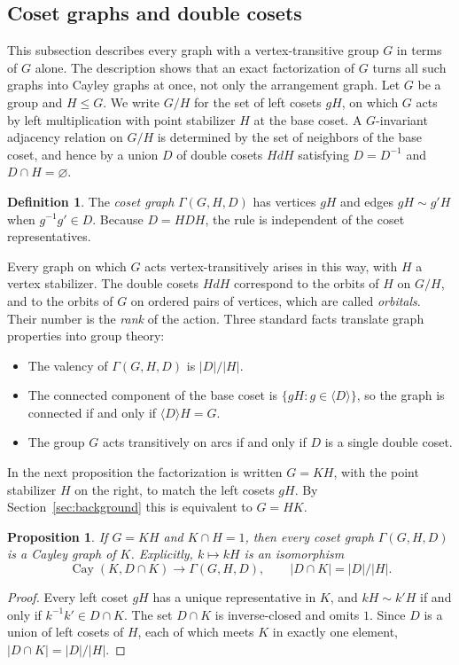 \documentclass[12pt,letterpaper]{article}
\numberwithin{equation}{section}
\newtheorem{proposition}[theorem]{Proposition}
\theoremstyle{definition}
\newtheorem{definition}[theorem]{Definition}
\DeclareMathOperator{\cayy}{Cay}
\begin{document}
\subsection{Coset graphs and double cosets}
This subsection describes every graph with a vertex-transitive group $G$ in terms of $G$ alone. The description shows that an exact factorization of $G$ turns all such graphs into Cayley graphs at once, not only the arrangement graph. Let $G$ be a group and $H\leq G$. We write $G/H$ for the set of left cosets $gH$, on which $G$ acts by left multiplication with point stabilizer $H$ at the base coset. A $G$-invariant adjacency relation on $G/H$ is determined by the set of neighbors of the base coset, and hence by a union $D$ of double cosets $HdH$ satisfying $D=D^{-1}$ and $D\cap H=\varnothing$.
\begin{definition}
The \emph{coset graph} $\Gamma(G,H,D)$ has vertices $gH$ and edges $gH\sim g'H$ when $g^{-1}g'\in D$. Because $D=HDH$, the rule is independent of the coset representatives.
\end{definition}
Every graph on which $G$ acts vertex-transitively arises in this way, with $H$ a vertex stabilizer. The double cosets $HdH$ correspond to the orbits of $H$ on $G/H$, and to the orbits of $G$ on ordered pairs of vertices, which are called \emph{orbitals}. Their number is the \emph{rank} of the action. Three standard facts translate graph properties into group theory:
\begin{itemize}
\item The valency of $\Gamma(G,H,D)$ is $|D|/|H|$.
\item The connected component of the base coset is $\{gH:g\in\langle D\rangle\}$, so the graph is connected if and only if $\langle D\rangle H=G$.
\item The group $G$ acts transitively on arcs if and only if $D$ is a single double coset.
\end{itemize}
In the next proposition the factorization is written $G=KH$, with the point stabilizer $H$ on the right, to match the left cosets $gH$. By Section~\ref{sec:background} this is equivalent to $G=HK$.
\begin{proposition}\label{prop:coset}
If $G=KH$ and $K\cap H=1$, then every coset graph $\Gamma(G,H,D)$ is a Cayley graph of $K$. Explicitly, $k\mapsto kH$ is an isomorphism
\[
\cayy(K,D\cap K)\longrightarrow\Gamma(G,H,D),\qquad |D\cap K|=|D|/|H|.
\]
\end{proposition}
\begin{proof}
Every left coset $gH$ has a unique representative in $K$, and $kH\sim k'H$ if and only if $k^{-1}k'\in D\cap K$. The set $D\cap K$ is inverse-closed and omits $1$. Since $D$ is a union of left cosets of $H$, each of which meets $K$ in exactly one element, $|D\cap K|=|D|/|H|$.
\end{proof}
\end{document}
